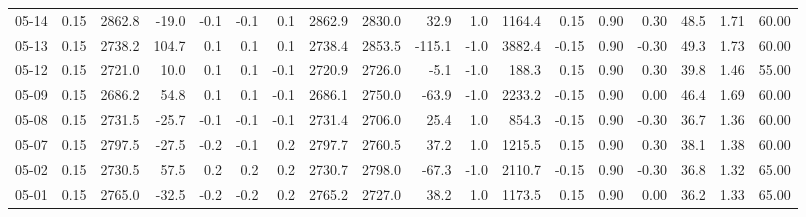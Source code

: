 \begin{threeparttable}
{\begin{tabular}{lrrrrrrrrrrrrrrrrr}
  05-14 &     0.15 & 2862.8 &             -19.0 &              -0.1 &               -0.1 &                0.1 & 2862.9 & 2830.0 &       32.9 &                      1.0 &              1164.4 &       0.15 &      0.90 &           0.30 &             48.5 &            1.71 &                  60.00 \\
  05-13 &     0.15 & 2738.2 &             104.7 &               0.1 &                0.1 &                0.1 & 2738.4 & 2853.5 &     -115.1 &                     -1.0 &              3882.4 &      -0.15 &      0.90 &          -0.30 &             49.3 &            1.73 &                  60.00 \\
  05-12 &     0.15 & 2721.0 &              10.0 &               0.1 &                0.1 &               -0.1 & 2720.9 & 2726.0 &       -5.1 &                     -1.0 &               188.3 &       0.15 &      0.90 &           0.30 &             39.8 &            1.46 &                  55.00 \\
  05-09 &     0.15 & 2686.2 &              54.8 &               0.1 &                0.1 &               -0.1 & 2686.1 & 2750.0 &      -63.9 &                     -1.0 &              2233.2 &      -0.15 &      0.90 &           0.00 &             46.4 &            1.69 &                  60.00 \\
  05-08 &     0.15 & 2731.5 &             -25.7 &              -0.1 &               -0.1 &               -0.1 & 2731.4 & 2706.0 &       25.4 &                      1.0 &               854.3 &      -0.15 &      0.90 &          -0.30 &             36.7 &            1.36 &                  60.00 \\
  05-07 &     0.15 & 2797.5 &             -27.5 &              -0.2 &               -0.1 &                0.2 & 2797.7 & 2760.5 &       37.2 &                      1.0 &              1215.5 &       0.15 &      0.90 &           0.30 &             38.1 &            1.38 &                  60.00 \\
  05-02 &     0.15 & 2730.5 &              57.5 &               0.2 &                0.2 &                0.2 & 2730.7 & 2798.0 &      -67.3 &                     -1.0 &              2110.7 &      -0.15 &      0.90 &          -0.30 &             36.8 &            1.32 &                  65.00 \\
  05-01 &     0.15 & 2765.0 &             -32.5 &              -0.2 &               -0.2 &                0.2 & 2765.2 & 2727.0 &       38.2 &                      1.0 &              1173.5 &       0.15 &      0.90 &           0.00 &             36.2 &            1.33 &                  65.00 \\

\end{tabular}}
\end{threeparttable}
